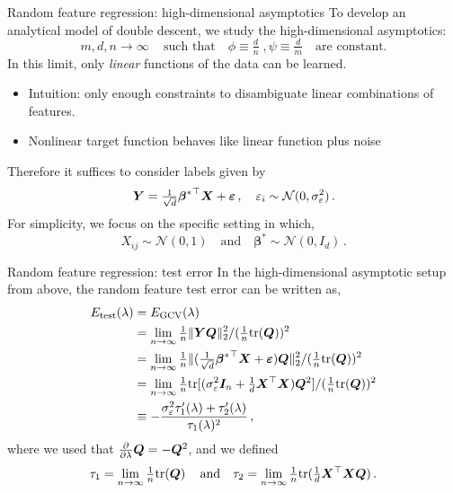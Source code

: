 \documentclass[10pt, aspectratio=169]{beamer}
\newcommand{\bbeta}{\bm{\beta}}
\begin{document}
\begin{frame}[t]{Random feature regression: high-dimensional asymptotics}
To develop an analytical model of double descent, we study the high-dimensional asymptotics:
$$ m,d,n \to \infty\,\quad \text{such that}\quad \phi \equiv \tfrac{d}{n}\;, \psi \equiv \tfrac{d}{m}\quad \text{are constant.}$$
\pause
In this limit, only \emph{linear} functions of the data can be learned.
\begin{itemize}
    \item Intuition: only enough constraints to disambiguate linear combinations of features.
    \item Nonlinear target function behaves like linear function plus noise%
\end{itemize}
\pause
Therefore it suffices to consider labels given by
$$\YY = \tfrac{1}{\sqrt{d}}{\bbeta^*}^\top \XX + \bm{\varepsilon}\,,\quad \varepsilon_i \sim \mathcal{N}(0,\sigma_{\varepsilon}^2)\,.$$
\pause
For simplicity, we focus on the specific setting in which,
$$X_{ij}\sim \mathcal{N}(0,1)\quad \text{and}\quad{\bbeta^*} \sim \mathcal{N}(0,I_d)\,.$$
\end{frame}
\begin{frame}[t]{Random feature regression: test error}
In the high-dimensional asymptotic setup from above, the random feature test error can be written as,
\begin{align*}
    E_{\text{test}}(\lambda) &= E_{\text{GCV}}(\lambda)\\
    &= \lim_{n\to\infty} \tfrac{1}{n}\|\YY\QQ\|_2^2/(\tfrac{1}{n}\text{tr}(\QQ))^2\\
    &= \lim_{n\to\infty}\tfrac{1}{n} \|(\tfrac{1}{\sqrt{d}}{\bbeta^*}^\top \XX + \bm{\varepsilon})\QQ\|_2^2/(\tfrac{1}{n}\text{tr}(\QQ))^2\\
    &= \lim_{n\to\infty}\tfrac{1}{n} \text{tr}[(\sigma_{\varepsilon}^2 \II_n + \tfrac{1}{d}\XX^\top \XX)\QQ^2]/(\tfrac{1}{n}\text{tr}(\QQ))^2\\
    &\equiv -\frac{\sigma_{\varepsilon}^2 \tau_1'(\lambda) + \tau_2'(\lambda)}{\tau_1(\lambda)^2}\,,
\end{align*}
where we used that $\tfrac{\partial}{\partial \lambda} {\boldsymbol Q} = -{\boldsymbol Q}^2$, and we defined
$$ \tau_1 = \lim_{n\to\infty} \tfrac{1}{n}\text{tr}({\boldsymbol Q})\,\quad \text{and} \quad \tau_2 = \lim_{n\to\infty} \tfrac{1}{n}\text{tr}(\tfrac{1}{d}{\boldsymbol X}^\top {\boldsymbol X} {\boldsymbol Q})\,.$$
\end{frame}
\end{document}
